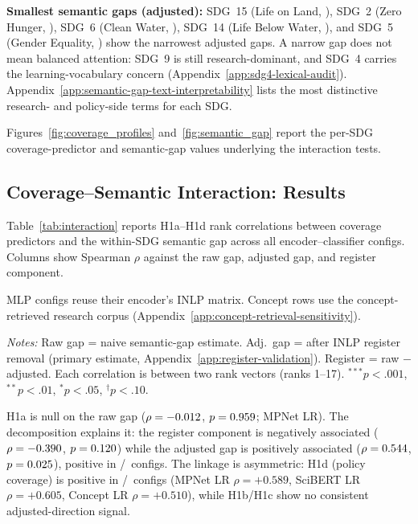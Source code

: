 \documentclass[12pt,a4paper]{article}
\begin{document}
\textbf{Smallest semantic gaps (adjusted):} SDG~15 (Life on Land, \AdjGapSdgFifteen), SDG~2 (Zero Hunger, \AdjGapSdgTwo), SDG~6 (Clean Water, \AdjGapSdgSix), SDG~14 (Life Below Water, \AdjGapSdgFourteen), and SDG~5 (Gender Equality, \AdjGapSdgFive) show the narrowest adjusted gaps. A narrow gap does not mean balanced attention: SDG~9 is still research-dominant, and SDG~4 carries the learning-vocabulary concern (Appendix~\ref{app:sdg4-lexical-audit}). Appendix~\ref{app:semantic-gap-text-interpretability} lists the most distinctive research- and policy-side terms for each SDG.

Figures~\ref{fig:coverage_profiles} and~\ref{fig:semantic_gap} report the per-SDG coverage-predictor and semantic-gap values underlying the interaction tests.

\subsection{Coverage--Semantic Interaction: Results}\label{sec:interaction}

Table~\ref{tab:interaction} reports H1a--H1d rank correlations between coverage predictors and the within-SDG semantic gap across all encoder--classifier configs. Columns show Spearman $\rho$ against the raw gap, adjusted gap, and register component.

MLP configs reuse their encoder's INLP matrix. Concept rows use the concept-retrieved research corpus (Appendix~\ref{app:concept-retrieval-sensitivity}).

\begin{table}[htbp]
\centering
\small
\caption{H1a--H1d coverage-predictor vs semantic-gap rank correlations (Spearman $\rho$) across encoder--classifier configs.}
\label{tab:interaction}

\par\smallskip\footnotesize\emph{Notes:} Raw gap = naive semantic-gap estimate. Adj.\ gap = after INLP register removal (primary estimate, Appendix~\ref{app:register-validation}). Register = raw $-$ adjusted. Each correlation is between two rank vectors (ranks 1--17). $^{***}p<.001$, $^{**}p<.01$, $^{*}p<.05$, $^{\dagger}p<.10$.\par
\end{table}

  H1a is null on the raw gap ($\rho = -0.012$, $p = 0.959$; MPNet LR). The decomposition explains it: the register component is negatively associated ($\rho = -0.390$, $p = 0.120$) while the adjusted gap is positively associated ($\rho = 0.544$, $p = 0.025$), positive in \HOneACovgapAdjPositiveCount/\HOneACovgapAdjPositiveCountTotal\ configs. The linkage is asymmetric: H1d (policy coverage) is positive in \HOneDPolicyAdjPositiveCount/\HOneDPolicyAdjPositiveCountTotal\ configs (MPNet LR $\rho = +0.589$, SciBERT LR $\rho = +0.605$, Concept LR $\rho = +0.510$), while H1b/H1c show no consistent adjusted-direction signal.
\end{document}
